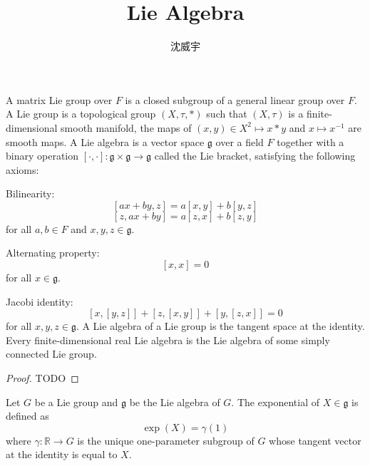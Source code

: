 \documentclass[a4paper,12pt]{article}
\begin{document}
\title{Lie Algebra}
\author{沈威宇}
\date{\temtoday}
\titletocdoc
{}
A matrix Lie group over $F$ is a closed subgroup of a general linear group over $F$.
A Lie group is a topological group $(X,\tau,*)$ such that $(X,\tau)$ is a finite-dimensional smooth manifold, the maps of $(x,y)\in X^2\mapsto x*y$ and $x\mapsto x^{-1}$ are smooth maps.
A Lie algebra is a vector space $\mathfrak{g}$ over a field $F$ together with a binary operation $[\cdot,\cdot]\colon\mathfrak{g}\times\mathfrak{g}\to\mathfrak{g}$ called the Lie bracket, satisfying the following axioms:
\bit
\item Bilinearity:
\[[ax+by,z]=a[x,y]+b[y,z]\]
\[[z,ax+by]=a[z,x]+b[z,y]\]
for all $a,b\in F$ and $x,y,z\in\mathfrak{g}$.
\item Alternating property:
\[[x,x]=0\]
for all $x\in\mathfrak{g}$.
\item Jacobi identity:
\[[x,[y,z]]+[z,[x,y]]+[y,[z,x]]=0\]
for all $x,y,z\in\mathfrak{g}$.
\eit
{}
A Lie algebra of a Lie group is the tangent space at the identity.
Every finite-dimensional real Lie algebra is the Lie algebra of some simply connected Lie group.
\begin{proof}
TODO
\end{proof}
Let $G$ be a Lie group and $\mathfrak {g}$ be the Lie algebra of $G$. The exponential of $X\in\mathfrak {g}$ is defined as
\[\exp(X)=\gamma (1)\]
where $\gamma \colon \mathbb {R} \to G$ is the unique one-parameter subgroup of $G$ whose tangent vector at the identity is equal to $X$.
\end{document}
